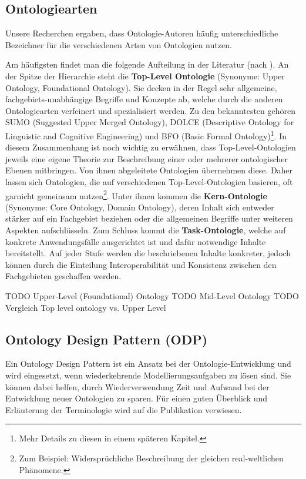 \documentclass{article}
\begin{document}
\subsection{Ontologiearten}

Unsere Recherchen ergaben, dass Ontologie-Autoren häufig unterschiedliche Bezeichner für die verschiedenen Arten von Ontologien nutzen.

Am häufigsten findet man die folgende Aufteilung in der Literatur (nach \cite{hoehndorf2009developing}). An der Spitze der Hierarchie steht die \textbf{Top-Level Ontologie} (Synonyme: Upper Ontology, Foundational Ontology).
Sie decken in der Regel sehr allgemeine, fachgebiets-unabhängige Begriffe und Konzepte ab, welche durch die anderen Ontologiearten verfeinert und spezialisiert werden.
Zu den bekanntesten gehören SUMO (Suggested Upper Merged Ontology), DOLCE (Descriptive Ontology for Linguistic and Cognitive Engineering) und BFO (Basic Formal Ontology)\footnote{Mehr Details zu diesen in einem späteren Kapitel.}.
In diesem Zusammenhang ist noch wichtig zu erwähnen, dass Top-Level-Ontologien jeweils eine eigene Theorie zur Beschreibung einer oder mehrerer ontologischer Ebenen mitbringen.
Von ihnen abgeleitete Ontologien übernehmen diese.
Daher lassen sich Ontologien, die auf verschiedenen Top-Level-Ontologien basieren, oft garnicht gemeinsam nutzen\footnote{Zum Beispiel: Widersprüchliche Beschreibung der gleichen real-weltlichen Phänomene.}.
Unter ihnen kommen die \textbf{Kern-Ontologie} (Synonyme: Core Ontology, Domain Ontology), deren Inhalt sich entweder stärker auf ein Fachgebiet beziehen oder die allgemeinen Begriffe unter weiteren Aspekten aufschlüsseln.
Zum Schluss kommt die \textbf{Task-Ontologie}, welche auf konkrete Anwendungsfälle ausgerichtet ist und dafür notwendige Inhalte bereitstellt.
Auf jeder Stufe werden die beschriebenen Inhalte konkreter, jedoch können durch die Einteilung Interoperabilität und Konsistenz zwischen den Fachgebieten geschaffen werden.

TODO Upper-Level (Foundational) Ontology
TODO Mid-Level Ontology
TODO Vergleich Top level ontology vs. Upper Level

\subsection{Ontology Design Pattern (ODP)}


Ein Ontology Design Pattern ist ein Ansatz bei der Ontologie-Entwicklung und wird eingesetzt, wenn wiederkehrende Modellierungsaufgaben zu lösen sind.
Sie können dabei helfen, durch Wiederverwendung Zeit und Aufwand bei der Entwicklung neuer Ontologien zu sparen.
Für einen guten Überblick und Erläuterung der Terminologie wird auf die Publikation \cite{falbo2013ontology} verwiesen.
\end{document}
